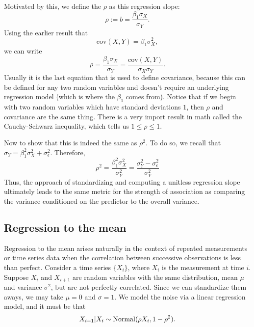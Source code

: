 Motivated by this, we define the  \(\rho\) as this regression slope:
\[
\rho := b = \frac{\beta_1 \sigma_X}{\sigma_Y}.
\]
Using the earlier result that 
\[
\mathrm{cov}(X,Y) = \beta_1 \sigma_X^2,
\]
we can write
\[
\rho = \frac{\beta_1 \sigma_X}{\sigma_Y} = \frac{\mathrm{cov}(X,Y)}{\sigma_X \sigma_Y}.
\]
Usually it is the last equation that is used to define covariance, because this can be defined for any two random variables and doesn't require an underlying regression model (which is where the $\beta_1$ comes from). 
Notice that if we begin with two random variables which have standard deviations $1$, then $\rho$ and covariance are the same thing. There is a very import result in math called the Cauchy-Schwarz inequality, which tells us $1 \le \rho\le 1$. 

Now to show that this is indeed the same as $\rho^2$. To do so, we recall that $\sigma_Y = \beta_1^2\sigma_X^2 + \sigma_{\epsilon}^2$. Therefore, 
\begin{equation}
\rho^2 = \frac{\beta_1^2 \sigma_X^2}{\sigma_Y^2} =  \frac{\sigma_Y^2 -\sigma_{\epsilon}^2 }{\sigma_Y^2}
\end{equation}
Thus, the approach of standardizing and computing a unitless regression slope ultimately leads to the same metric for the strength of association as comparing the variance conditioned on the predictor to the overall variance. 




\subsection{Regression to the mean}

Regression to the mean arises naturally in the context of repeated measurements or time series data when the correlation between successive observations is less than perfect.
Consider a time series \(\{X_i\}\), where \(X_i\) is the measurement at time \(i\). Suppose \(X_i\) and \(X_{i+1}\) are random variables with the same distribution, mean \(\mu\) and variance \(\sigma^2\), but are not perfectly correlated. Since we can standardize them aways, we may take $\mu=0$ and $\sigma=1$.  We model the noise via a linear regression model, and it must be that 
\begin{equation} 
X_{i+1}|X_i \sim {\rm Normal}(\rho X_i ,1-\rho^2).
\end{equation}


